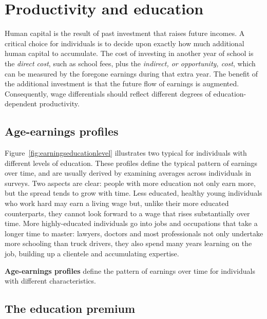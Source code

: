 \section{Productivity and education}\label{sec:ch13sec2}

Human capital is the result of past investment that raises future incomes. A critical choice for individuals is to decide upon exactly how much additional human capital to accumulate. The cost of investing in another year of school is the \textit{direct cost}, such as school fees, plus the \textit{indirect, or opportunity, cost}, which can be measured by the foregone earnings during that extra year. The benefit of the additional investment is that the future flow of earnings is augmented. Consequently, wage differentials should reflect different degrees of education-dependent productivity.

\subsection*{Age-earnings profiles}

Figure~\ref{fig:earningseducationlevel} illustrates two typical  for individuals with different levels of education. These profiles define the typical pattern of earnings over time, and are usually derived by examining averages across individuals in surveys. Two aspects are clear: people with more education not only earn more, but the spread tends to grow with time. Less educated, healthy young individuals who work hard may earn a living wage but, unlike their more educated counterparts, they cannot look forward to a wage that rises substantially over time. More highly-educated individuals go into jobs and occupations that take a longer time to master: lawyers, doctors and most professionals not only undertake more schooling than truck drivers, they also spend many years learning on the job, building up a clientele and accumulating expertise.



\begin{DefBox}
\textbf{Age-earnings profiles} define the pattern of earnings over time for individuals with different characteristics.
\end{DefBox}

\subsection*{The education premium}

